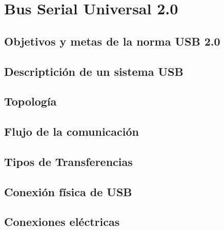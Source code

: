 \chapter{Bus Serial Universal 2.0}
	\label{cap:usb}
	
		\section{Objetivos y metas de la norma USB 2.0}
			\label{usb:ov}
			
		\section{Descriptición de un sistema USB}
			\label{usb:dispo}
		\section{Topología}
		\section{Flujo de la comunicación}
		\section{Tipos de Transferencias}
		\section{Conexión física de USB}
			\label{usb:fis}
			
		\section{Conexiones eléctricas}